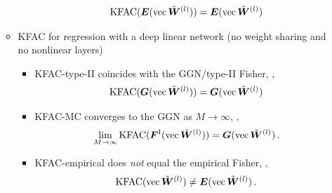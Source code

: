 \begin{itemize}
\begin{itemize}
\begin{itemize}
            \begin{align*}
              \mathrm{KFAC}({\bm{E}}(\operatorname{vec}\tilde{{\bm{W}}}^{(l)})) = {\bm{E}}(\operatorname{vec} \tilde{{\bm{W}}}^{(l)})
            \end{align*}
        \end{itemize}
      \item KFAC for regression with a deep linear network (no weight sharing and no nonlinear layers)
        \begin{itemize}
          \item KFAC-type-II coincides with the GGN/type-II Fisher, \ie,
            \begin{align*}
              \mathrm{KFAC}({\bm{G}}(\operatorname{vec} \tilde{{\bm{W}}}^{(l)})) = {\bm{G}}(\operatorname{vec} \tilde{{\bm{W}}}^{(l)})
            \end{align*}
          \item KFAC-MC converges to the GGN as $M\rightarrow\infty$, \ie,
            \begin{align*}
              \lim_{M \to \infty} \mathrm{KFAC}({\bm{F}}^{\text{I}}(\operatorname{vec} \tilde{{\bm{W}}}^{(l)})) = {\bm{G}}(\operatorname{vec} \tilde{{\bm{W}}}^{(l)})\,.
            \end{align*}
          \item KFAC-empirical does \emph{not} equal the empirical Fisher, \ie,
            \begin{align*}
              \mathrm{KFAC}(\operatorname{vec} \tilde{{\bm{W}}}^{(l)})
              \neq
              {\bm{E}}(\operatorname{vec} \tilde{{\bm{W}}}^{(l)})\,.
            \end{align*}
        \end{itemize}
      \end{itemize}
    \end{itemize}
